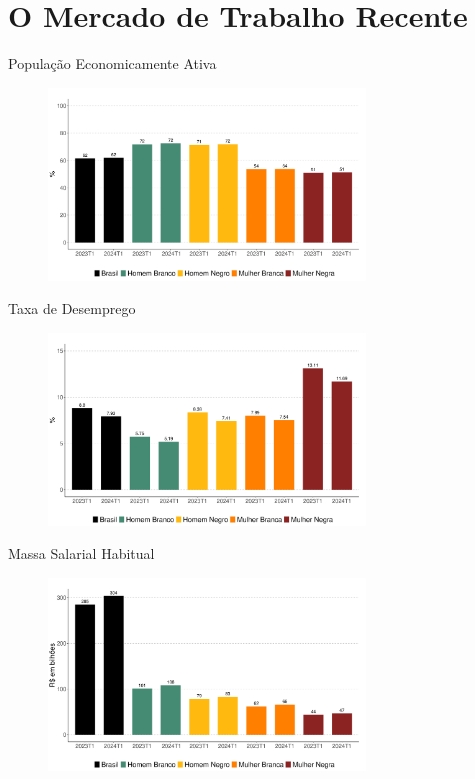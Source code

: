 \documentclass[10pt, xcolor=x11names,compress]{beamer}
\begin{document}
	\section{O Mercado de Trabalho Recente}
	\begin{frame}{População Economicamente Ativa}
		\begin{figure}
			\centering
			\includegraphics[width = 0.75\textwidth]{../figures_output/pea.pdf}
		\end{figure}
	\end{frame}			
	
	\begin{frame}{Taxa de Desemprego}
		\begin{figure}
			\centering
			\includegraphics[width = 0.75\textwidth]{../figures_output/unemp.pdf}
		\end{figure}
	\end{frame}	
	
	\begin{frame}{Massa Salarial Habitual}
		\begin{figure}
			\centering
			\includegraphics[width = 0.75\textwidth]{../figures_output/massa_habitual.pdf}
		\end{figure}
	\end{frame}
	
\end{document}
